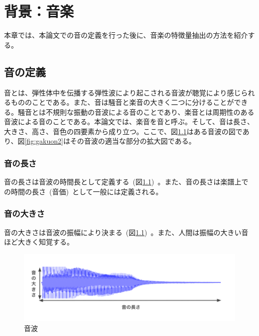 \chapter{背景：音楽}

本章では、本論文での音の定義を行った後に、音楽の特徴量抽出の方法を紹介する。

\section{音の定義}

音とは、弾性体中を伝播する弾性波により起こされる音波が聴覚により感じられるもののことである。また、音は騒音と楽音の大きく二つに分けることができる。騒音とは不規則な振動の音波による音のことであり、楽音とは周期性のある音波による音のことである。本論文では、楽音を音と呼ぶ。そして、音は長さ、大きさ、高さ、音色の四要素から成り立つ。ここで、図\ref{fig:gakuon1}はある音波の図であり、図\ref{fig:gakuon2}はその音波の適当な部分の拡大図である。

\subsection{音の長さ}

音の長さは音波の時間長として定義する~(図\ref{fig:gakuon1})~。また、音の長さは楽譜上での時間の長さ~(音価)~として一般には定義される。

\subsection{音の大きさ}

音の大きさは音波の振幅により決まる~(図\ref{fig:gakuon1})~。また、人間は振幅の大きい音ほど大きく知覚する。

\begin{figure}[b]
\begin{center}
\includegraphics[width=\hsize]{figure/gakuon1.png}
\caption{音波}
\label{fig:gakuon1}
\end{center}
\end{figure}

